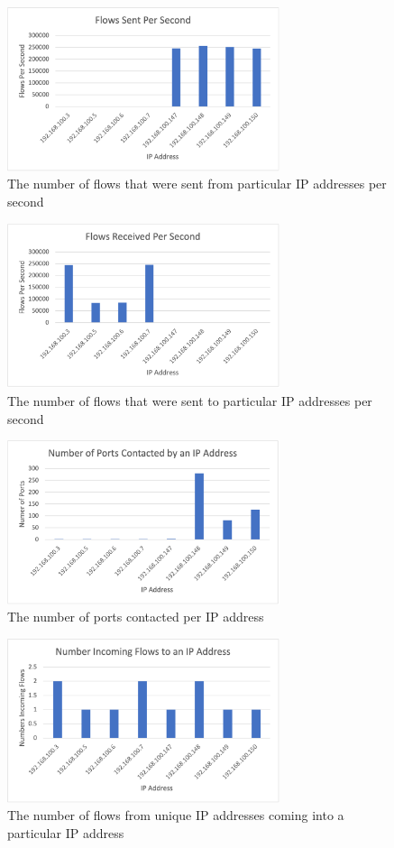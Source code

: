 \documentclass[conference]{IEEEtran}
\begin{document}
\begin{figure}[h]
    \includegraphics[width=8cm]{Figure3.png}
    \centering
    \caption{The number of flows that were sent from particular IP addresses per second}
    \label{fig:sentfrompersec}
\end{figure}

\begin{figure}[h]
    \includegraphics[width=8cm]{Figure4.png}
    \centering
    \caption{The number of flows that were sent to particular IP addresses per second}
    \label{fig:senttopersec}
\end{figure}

\begin{figure}[h]
    \includegraphics[width=8cm]{Figure5.png}
    \centering
    \caption{The number of ports contacted per IP address}
    \label{fig:portscontacted}
\end{figure}

\begin{figure}[h]
    \includegraphics[width=8cm]{Figure6.png}
    \centering
    \caption{The number of flows from unique IP addresses coming into a particular IP address}
    \label{fig:incomingflows}
\end{figure}
\end{document}
